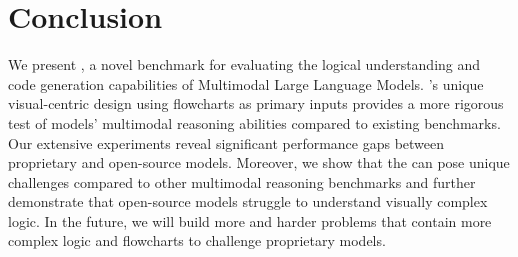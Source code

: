 \section{Conclusion}
We present \benchmark, a novel benchmark for evaluating the logical understanding and code generation capabilities of Multimodal Large Language Models. \benchmark's unique visual-centric design using flowcharts as primary inputs provides a more rigorous test of models' multimodal reasoning abilities compared to existing benchmarks. Our extensive experiments reveal significant performance gaps between proprietary and open-source models. Moreover, we show that the \benchmark can pose unique challenges compared to other multimodal reasoning benchmarks and further demonstrate that open-source models struggle to understand visually complex logic. In the future, we will build more and harder problems that contain more complex logic and flowcharts to challenge proprietary models.